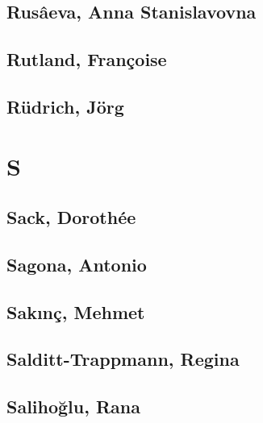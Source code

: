 \subsection[Rusâeva, Anna Stanislavovna (2)]{Rusâeva, Anna Stanislavovna}


\subsection[Rutland, Françoise (1)]{Rutland, Françoise}

\subsection[Rüdrich, Jörg (1)]{Rüdrich, Jörg}

\section{S}

\subsection[Sack, Dorothée (1)]{Sack, Dorothée}

\subsection[Sagona, Antonio (1)]{Sagona, Antonio}

\subsection[Sakınç, Mehmet (1)]{Sakınç, Mehmet}

\subsection[Salditt-Trappmann, Regina (1)]{Salditt-Trappmann, Regina}

\subsection[Salihoğlu, Rana (1)]{Salihoğlu, Rana}

